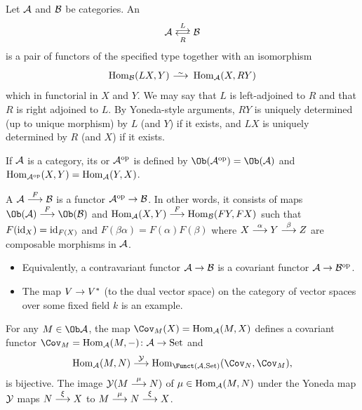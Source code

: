 \documentclass[a4paper,parskip=half,numbers=enddot, DIV=12]{scrreprt}
\begin{document}
    \begin{defi}
        Let $\mathcal{A}$ and $\mathcal{B}$ be categories. An  
        \begin{align*}
        	\Aa\doublelrmorphism[L][R]\Bb
        \end{align*}
        is a pair of functors of the specified type together with an isomorphism 
        \begin{align*}
        	\Hom_\Bb(LX, Y) \isomorphism \Hom_\Aa(X, RY)
        \end{align*}
        which in functorial in $X$ and $Y$. We may say that $L$ is left-adjoined to $R$ and that  $R$ is right adjoined to $L$. By Yoneda-style arguments, $RY$ is uniquely determined (up to unique morphism) by $L$ (and $Y$) if it exists, and $LX$ is uniquely determined by $R$ (and $X$) if it exists.
    \end{defi}
    \begin{defi}
    	\begin{alphanumerate}
    		\item If $\mathcal{A}$ is a category, its  or  $\mathcal{A}^{\mathrm{op}}$ is defined by  $\Ob(\Aa^\op) = \Ob(\Aa)$ and $\operatorname{Hom}_{\mathcal{A}^{\mathrm{op}}}(X,Y) = \operatorname{Hom}_{\mathcal{A}}(Y,X)$.
    		\item A  $\Aa\morphism[F]\Bb$ is a functor $\Aa^\op\morphism \Bb$. In other words, it consists of maps $\Ob(\Aa)\morphism[F]\Ob(\Bb)$ and $\Hom_\Aa(X,Y) \morphism[F] \Hom_\Bb(FY, FX)$ such that $F(\operatorname{id}_X) = \operatorname{id}_{F(X)}$ and $F(\beta\alpha)  = F(\alpha)F(\beta)$ where $X\morphism[\alpha]Y\morphism[\beta] Z$ are composable morphisms in $\mathcal{A}$.
    	\end{alphanumerate}
    \end{defi}
    \begin{rem*}
    	\begin{itemize}
    		\item 
    		Equivalently, a contravariant functor $\Aa\morphism \Bb$ is a covariant functor $\Aa\morphism \Bb^\op$.
    		\item
    		The map $V\morphism V^\ast$ (to the dual vector space) on the category of vector spaces over some fixed field $k$ is an example.
    	\end{itemize}
    \end{rem*}
	\begin{lem}
         For any $M\in\Ob \Aa$, the map $\Cov_M(X) = \Hom_\Aa(M,X)$ defines a covariant functor $\Cov_M=\Hom_\Aa(M,-)\colon \Aa\morphism \cat{Set}$ and 
        \begin{align*}
            \Hom_\Aa(M,N) \morphism[\Yy] \Hom_{\Funct(\Aa,\cat{Set})} (\Cov_N, \Cov_M),
        \end{align*}
        is bijective. The image $\Yy(M\morphism[\mu]N)$ of $\mu\in\operatorname{Hom}_{\mathcal{A}}(M,N)$ under the Yoneda map $\mathcal{Y}$ maps $N\morphism[\xi]X$ to $M\morphism[\mu]N\morphism[\xi]X$.
    \end{lem}
\end{document}

